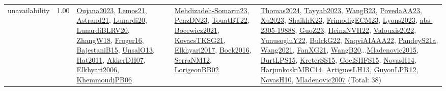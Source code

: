 {\begin{longtable}{p{3cm}r>{\raggedright\arraybackslash}p{6cm}>{\raggedright\arraybackslash}p{6cm}>{\raggedright\arraybackslash}p{8cm}}
\index{unavailability}\index{Concepts!unavailability}unavailability &  1.00 & \hyperref[detail:Oujana2023]{Oujana2023}, \hyperref[detail:Lemos21]{Lemos21}, \hyperref[detail:Astrand21]{Astrand21}, \hyperref[detail:Lunardi20]{Lunardi20}, \hyperref[detail:LunardiBLRV20]{LunardiBLRV20}, \hyperref[detail:ZhangW18]{ZhangW18}, \hyperref[detail:Froger16]{Froger16}, \hyperref[detail:BajestaniB15]{BajestaniB15}, \hyperref[detail:UnsalO13]{UnsalO13}, \hyperref[detail:Hat2011]{Hat2011}, \hyperref[detail:AkkerDH07]{AkkerDH07}, \hyperref[detail:Elkhyari2006]{Elkhyari2006}, \hyperref[detail:KhemmoudjPB06]{KhemmoudjPB06} & \hyperref[detail:Mehdizadeh-Somarin23]{Mehdizadeh-Somarin23}, \hyperref[detail:PenzDN23]{PenzDN23}, \hyperref[detail:TouatBT22]{TouatBT22}, \hyperref[detail:Bocewicz2021]{Bocewicz2021}, \hyperref[detail:KovacsTKSG21]{KovacsTKSG21}, \hyperref[detail:Elkhyari2017]{Elkhyari2017}, \hyperref[detail:Boek2016]{Boek2016}, \hyperref[detail:SerraNM12]{SerraNM12}, \hyperref[detail:LorigeonBB02]{LorigeonBB02} & \hyperref[detail:Thomas2024]{Thomas2024}, \hyperref[detail:Tayyab2023]{Tayyab2023}, \hyperref[detail:WangB23]{WangB23}, \hyperref[detail:PovedaAA23]{PovedaAA23}, \hyperref[detail:Xu2023]{Xu2023}, \hyperref[detail:ShaikhK23]{ShaikhK23}, \hyperref[detail:FrimodigECM23]{FrimodigECM23}, \hyperref[detail:Lyons2023]{Lyons2023}, \hyperref[detail:abs-2305-19888]{abs-2305-19888}, \hyperref[detail:GuoZ23]{GuoZ23}, \hyperref[detail:HeinzNVH22]{HeinzNVH22}, \hyperref[detail:Valouxis2022]{Valouxis2022}, \hyperref[detail:YunusogluY22]{YunusogluY22}, \hyperref[detail:BulckG22]{BulckG22}, \hyperref[detail:NaqviAIAAA22]{NaqviAIAAA22}, \hyperref[detail:PandeyS21a]{PandeyS21a}, \hyperref[detail:Wang2021]{Wang2021}, \hyperref[detail:FanXG21]{FanXG21}, \hyperref[detail:WangB20]{WangB20}...\hyperref[detail:Mladenovic2015]{Mladenovic2015}, \hyperref[detail:BurtLPS15]{BurtLPS15}, \hyperref[detail:KreterSS15]{KreterSS15}, \hyperref[detail:GoelSHFS15]{GoelSHFS15}, \hyperref[detail:NovasH14]{NovasH14}, \hyperref[detail:HarjunkoskiMBC14]{HarjunkoskiMBC14}, \hyperref[detail:ArtiguesLH13]{ArtiguesLH13}, \hyperref[detail:GuyonLPR12]{GuyonLPR12}, \hyperref[detail:NovasH10]{NovasH10}, \hyperref[detail:Mladenovic2007]{Mladenovic2007} (Total: 38)\\
\end{longtable}
}

\clearpage
